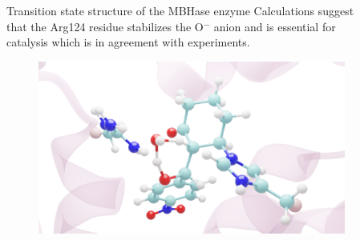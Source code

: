 \documentclass[final]{beamer}
\newlength{\sepwidth}
\newlength{\colwidth}
\newcommand{\separatorcolumn}{\begin{column}{\sepwidth}\end{column}}
\begin{document}
\begin{frame}[t]
\begin{columns}[t]
\begin{column}{\colwidth}
  \begin{block}{Transition state structure of the MBHase enzyme}
  Calculations suggest that the Arg124 residue stabilizes the O$^{-}$ anion and is essential for catalysis 
  which is in agreement with experiments.  
\begin{figure}
\includegraphics[width=0.54\colwidth]{figures/trans-120.png}
\end{figure}
  \end{block}

\end{column}

\separatorcolumn

\begin{column}{\colwidth}

  


\end{column}
\end{columns}
\end{frame}
\end{document}
